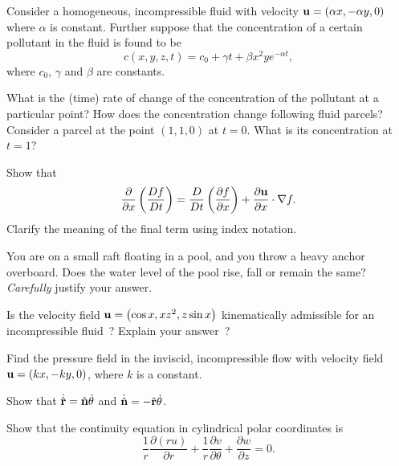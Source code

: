 \documentclass[10pt]{report}
\begin{document}
\begin{questionstar}
		Consider a homogeneous, incompressible fluid with velocity
		${\bf u} = (\alpha x, -\alpha y, 0)$ where $\alpha$ is constant.
		Further suppose that the concentration of a certain pollutant in the fluid is found to be
	    \[ c(x,y,z,t) = c_0 + \gamma t + \beta x^2 y e^{-\alpha t}, \]
     	where $c_0$, $\gamma$ and $\beta$ are constants.

	    What is the (time) rate of change of the concentration of the pollutant
	    at a particular point? How does the concentration change following fluid parcels?
	    Consider a parcel at the point $(1,1, 0)$ at $t = 0$. What is its concentration at $t = 1$?
	    \label{qn:pollute}
\end{questionstar}


\begin{question}
	Show that
	\[\frac{\partial }{\partial x}\left( {\frac{Df}{Dt}}
	\right)=\frac{D}{Dt}\left( \frac{\partial f}{\partial x} \right)  +  \frac{\partial {{\bf u}}}{\partial x} \cdot \nabla
	f. \]
	Clarify the meaning of the final term using index notation.
	\label{qn:DDt2}
\end{question}

\begin{question}
	You are on a small raft floating in a pool, and you throw a heavy anchor
	overboard. Does the water level of the pool rise, fall or remain the same?
	\textit{Carefully} justify your answer.
	\label{qn:raftanchor}
\end{question}

\begin{question}
	Is the velocity field ${{\bf u}}=\left( {\cos x,xz^2,z\sin x} \right)$
	kinematically admissible for an incompressible fluid~? Explain your answer~?
	\label{qn:admissible}
\end{question}

\begin{question}
	Find the pressure field in the inviscid, incompressible flow with
	velocity field ${{\bf u}}=\left( {kx,-ky,0} \right)$, where $k$ is a
	constant.
	\label{qn:pressurefield}
\end{question}

\begin{question}
	 Show that ${{ \dot {\hat {\bf r}}}}={{\hat {\bf n}}} \dot {\theta }$
	 and ${{\dot {\hat {\bf n}}}}=-{{\hat {\bf r}}}\dot {\theta }$.
	 \label{qn:rthetan}
\end{question}


\begin{question}
	 Show that the continuity equation in cylindrical polar coordinates is
	\[
	\frac{1}{r}\frac{\partial \left( {ru} \right)}{\partial
	r}+\frac{1}{r}\frac{\partial v}{\partial \theta
	}+\frac{\partial w}{\partial z}=0.
	\]
	\label{qn:divu-rthetaz}
\end{question}
\end{document}
